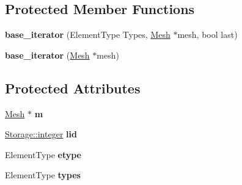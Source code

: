 \subsection*{Protected Member Functions}
\begin{DoxyCompactItemize}
\item 
\hypertarget{classINMOST_1_1Mesh_1_1base__iterator_ad45d33a8c95bb3c2dcdb2de971fcb67c}{{\bfseries base\-\_\-iterator} (Element\-Type Types, \hyperlink{classINMOST_1_1Mesh}{Mesh} $\ast$mesh, bool last)}\label{classINMOST_1_1Mesh_1_1base__iterator_ad45d33a8c95bb3c2dcdb2de971fcb67c}

\item 
\hypertarget{classINMOST_1_1Mesh_1_1base__iterator_a18693b1b90ca884efb913f147e4a534d}{{\bfseries base\-\_\-iterator} (\hyperlink{classINMOST_1_1Mesh}{Mesh} $\ast$mesh)}\label{classINMOST_1_1Mesh_1_1base__iterator_a18693b1b90ca884efb913f147e4a534d}

\end{DoxyCompactItemize}
\subsection*{Protected Attributes}
\begin{DoxyCompactItemize}
\item 
\hypertarget{classINMOST_1_1Mesh_1_1base__iterator_a0f7bf7b7fe3ccda4bc725033cf31649c}{\hyperlink{classINMOST_1_1Mesh}{Mesh} $\ast$ {\bfseries m}}\label{classINMOST_1_1Mesh_1_1base__iterator_a0f7bf7b7fe3ccda4bc725033cf31649c}

\item 
\hypertarget{classINMOST_1_1Mesh_1_1base__iterator_aae3d8d36a48d43bb0d05248d0dd66dfe}{\hyperlink{classINMOST_1_1Storage_aec96942bc647417a801e2895b45964d2}{Storage\-::integer} {\bfseries lid}}\label{classINMOST_1_1Mesh_1_1base__iterator_aae3d8d36a48d43bb0d05248d0dd66dfe}

\item 
\hypertarget{classINMOST_1_1Mesh_1_1base__iterator_a9147c2e3d17f1f6f4680109bcc0742f7}{Element\-Type {\bfseries etype}}\label{classINMOST_1_1Mesh_1_1base__iterator_a9147c2e3d17f1f6f4680109bcc0742f7}

\item 
\hypertarget{classINMOST_1_1Mesh_1_1base__iterator_a401525dcecea1a9a1e9cee5528b5b9eb}{Element\-Type {\bfseries types}}\label{classINMOST_1_1Mesh_1_1base__iterator_a401525dcecea1a9a1e9cee5528b5b9eb}

\end{DoxyCompactItemize}

